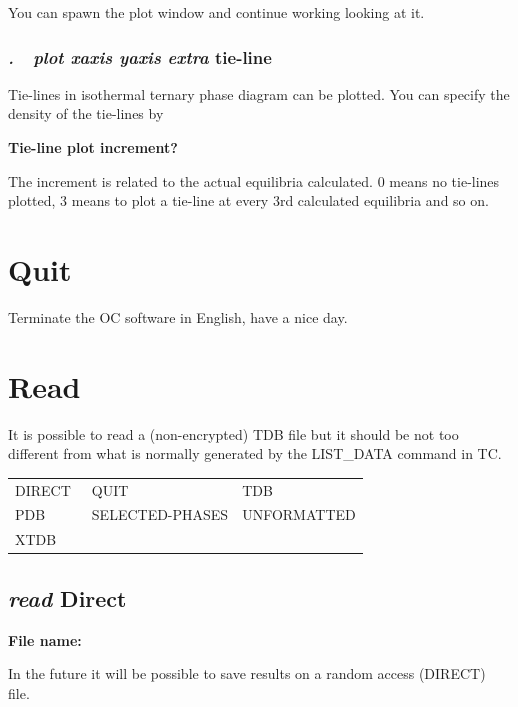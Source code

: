 \documentclass[11pt]{article}
\begin{document}
You can spawn the plot window and continue working looking at it.

\hypertarget{Plot tieline}{}
\subsubsection{{\em .~~plot xaxis yaxis extra} tie-line}

Tie-lines in isothermal ternary phase diagram can be plotted.  You
can specify the density of the tie-lines by

{\bf Tie-line plot increment?}

The increment is related to the actual equilibria calculated.  0 means
no tie-lines plotted, 3 means to plot a tie-line at every 3rd
calculated equilibria and so on.

\hypertarget{Quit}{}
\section{Quit }

Terminate the OC software in English, have a nice day.

\hypertarget{Read}{}
\section{Read }

It is possible to read a (non-encrypted) TDB file but it should be not
too different from what is normally generated by the LIST\_DATA
command in TC.

\begin{tabular}{lll}
 DIRECT~        & QUIT~            & TDB\\
 PDB            & SELECTED-PHASES  & UNFORMATTED \\
 XTDB           &                  &             \\
\end{tabular}

\hypertarget{Read direct}{}
\subsection{{\em read} Direct}

{\bf File name:}

In the future it will be possible to save results on a random access
(DIRECT) file.
\end{document}
